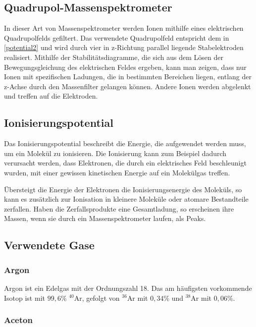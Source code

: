 \documentclass[10pt,a4paper]{article}
\begin{document}
\subsection{Quadrupol-Massenspektrometer}

In dieser Art von Massenspektrometer werden Ionen mithilfe eines elektrischen Quadrupolfelds gefiltert. Das verwendete Quadrupolfeld entspricht dem in \eqref{potential2} und wird durch vier in z-Richtung parallel liegende Stabelektroden realisiert. Mithilfe der Stabilitätsdiagramme, die sich aus dem Lösen der Bewegungsgleichung des elektrischen Feldes ergeben, kann man zeigen, dass nur Ionen mit spezifischen Ladungen, die in bestimmten Bereichen liegen, entlang der z-Achse durch den Massenfilter gelangen können. Andere Ionen werden abgelenkt und treffen auf die Elektroden.

\subsection{Ionisierungspotential}

Das Ionisierungspotential beschreibt die Energie, die aufgewendet werden muss, um ein Molekül zu ionisieren. Die Ionisierung kann zum Beispiel dadurch verursacht werden, dass Elektronen, die durch ein elektrisches Feld beschleunigt wurden, mit einer gewissen kinetischen Energie auf ein Molekülgas treffen.

Übersteigt die Energie der Elektronen die Ionisierungsenergie des Moleküls, so kann es zusätzlich zur Ionisation in kleinere Moleküle oder atomare Bestandteile zerfallen. Haben die Zerfallsprodukte eine Gesamtladung, so erscheinen ihre Massen, wenn sie durch ein Massenspektrometer laufen, als Peaks. 

\subsection{Verwendete Gase}

\subsubsection{Argon}

Argon ist ein Edelgas mit der Ordnungszahl 18. Das am häufigsten vorkommende Isotop ist mit $99,6\%$ $^{40}$Ar, gefolgt von $^{36}$Ar mit $0,34\%$ und $^{38}$Ar mit $0,06\%$.

\subsubsection{Aceton}
\end{document}
